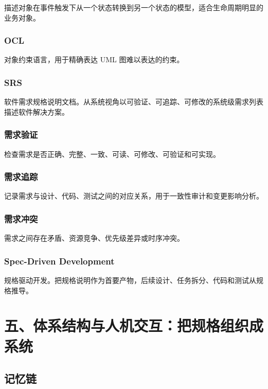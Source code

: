 \documentclass[UTF8,zihao=-4]{ctexart}
\begin{document}
描述对象在事件触发下从一个状态转换到另一个状态的模型，适合生命周期明显的业务对象。


\subsubsection*{OCL}


对象约束语言，用于精确表达 UML 图难以表达的约束。


\subsubsection*{SRS}


软件需求规格说明文档。从系统视角以可验证、可追踪、可修改的系统级需求列表描述软件解决方案。


\subsubsection*{需求验证}


检查需求是否正确、完整、一致、可读、可修改、可验证和可实现。


\subsubsection*{需求追踪}


记录需求与设计、代码、测试之间的对应关系，用于一致性审计和变更影响分析。


\subsubsection*{需求冲突}


需求之间存在矛盾、资源竞争、优先级差异或时序冲突。


\subsubsection*{Spec-Driven Development}


规格驱动开发。把规格说明作为首要产物，后续设计、任务拆分、代码和测试从规格推导。


\section{五、体系结构与人机交互：把规格组织成系统}


\subsection{记忆链}
\end{document}

